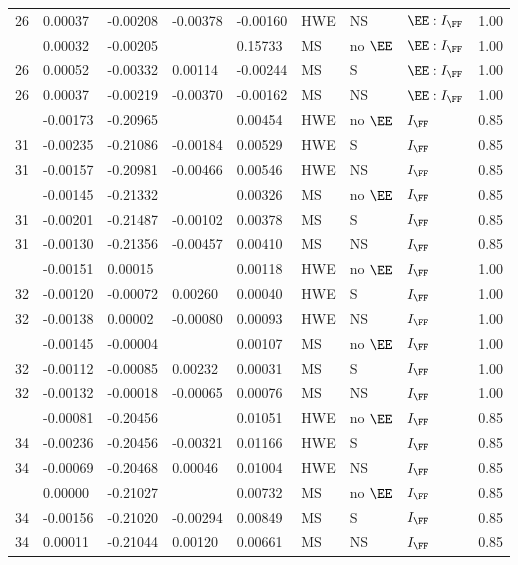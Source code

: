 \begin{longtable}[t]{lllllllll}
26 & 0.00037 & -0.00208 & -0.00378 & -0.00160 & HWE & NS & $\EE:I_{\FF}$ & 1.00\\
\addlinespace
26 & 0.00032 & -0.00205 &  & 0.15733 & MS & no $\EE$ & $\EE:I_{\FF}$ & 1.00\\
26 & 0.00052 & -0.00332 & 0.00114 & -0.00244 & MS & S & $\EE:I_{\FF}$ & 1.00\\
26 & 0.00037 & -0.00219 & -0.00370 & -0.00162 & MS & NS & $\EE:I_{\FF}$ & 1.00\\
\addlinespace
31 & -0.00173 & -0.20965 &  & 0.00454 & HWE & no $\EE$ & $I_{\FF}$ & 0.85\\
31 & -0.00235 & -0.21086 & -0.00184 & 0.00529 & HWE & S & $I_{\FF}$ & 0.85\\
31 & -0.00157 & -0.20981 & -0.00466 & 0.00546 & HWE & NS & $I_{\FF}$ & 0.85\\
\addlinespace
31 & -0.00145 & -0.21332 &  & 0.00326 & MS & no $\EE$ & $I_{\FF}$ & 0.85\\
31 & -0.00201 & -0.21487 & -0.00102 & 0.00378 & MS & S & $I_{\FF}$ & 0.85\\
31 & -0.00130 & -0.21356 & -0.00457 & 0.00410 & MS & NS & $I_{\FF}$ & 0.85\\
\addlinespace
32 & -0.00151 & 0.00015 &  & 0.00118 & HWE & no $\EE$ & $I_{\FF}$ & 1.00\\
32 & -0.00120 & -0.00072 & 0.00260 & 0.00040 & HWE & S & $I_{\FF}$ & 1.00\\
32 & -0.00138 & 0.00002 & -0.00080 & 0.00093 & HWE & NS & $I_{\FF}$ & 1.00\\
\addlinespace
32 & -0.00145 & -0.00004 &  & 0.00107 & MS & no $\EE$ & $I_{\FF}$ & 1.00\\
32 & -0.00112 & -0.00085 & 0.00232 & 0.00031 & MS & S & $I_{\FF}$ & 1.00\\
32 & -0.00132 & -0.00018 & -0.00065 & 0.00076 & MS & NS & $I_{\FF}$ & 1.00\\
\addlinespace
34 & -0.00081 & -0.20456 &  & 0.01051 & HWE & no $\EE$ & $I_{\FF}$ & 0.85\\
34 & -0.00236 & -0.20456 & -0.00321 & 0.01166 & HWE & S & $I_{\FF}$ & 0.85\\
34 & -0.00069 & -0.20468 & 0.00046 & 0.01004 & HWE & NS & $I_{\FF}$ & 0.85\\
\addlinespace
34 & 0.00000 & -0.21027 &  & 0.00732 & MS & no $\EE$ & $I_{\FF}$ & 0.85\\
34 & -0.00156 & -0.21020 & -0.00294 & 0.00849 & MS & S & $I_{\FF}$ & 0.85\\
34 & 0.00011 & -0.21044 & 0.00120 & 0.00661 & MS & NS & $I_{\FF}$ & 0.85\\

\end{longtable}
